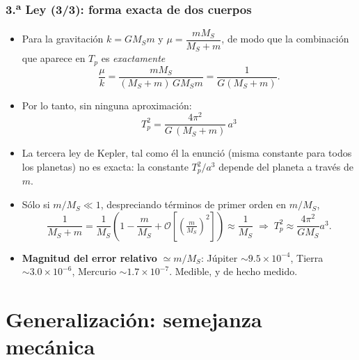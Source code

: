 \documentclass[10pt]{beamer}
\begin{document}
\begin{frame}
\frametitle{3.\textsuperscript{a} Ley (3/3): forma exacta de dos cuerpos}
\begin{itemize}
  \item<1-> Para la gravitación $k=GM_S m$ y $\mu=\dfrac{mM_S}{M_S+m}$, de modo
        que la combinación que aparece en $T_p$ es \emph{exactamente}
        \[ \frac{\mu}{k}=\frac{mM_S}{(M_S+m)\,G M_S m}=\frac{1}{G(M_S+m)} . \]
  \item<2-> Por lo tanto, sin ninguna aproximación:
        \[ \boxed{\;T_p^{2}=\frac{4\pi^{2}}{G\,(M_S+m)}\,a^{3}\;} \]
  \item<3-> \alert{La tercera ley de Kepler, tal como él la enunció}
        (misma constante para todos los planetas) \alert{no es exacta}: la
        constante $T_p^{2}/a^{3}$ depende del planeta a través de $m$.
  \item<4-> Sólo si $m/M_S\ll 1$, despreciando términos de \alert{primer} orden
        en $m/M_S$,
        \[ \frac{1}{M_S+m}=\frac{1}{M_S}\left(1-\frac{m}{M_S}+\mathcal{O}
           \!\left[\left(\tfrac{m}{M_S}\right)^{2}\right]\right)
           \approx\frac{1}{M_S}
           \;\Longrightarrow\; T_p^{2}\approx\frac{4\pi^{2}}{GM_S}a^{3}. \]
  \item<5-> \textbf{Magnitud del error relativo} $\simeq m/M_S$:
        Júpiter $\sim 9.5\times10^{-4}$, Tierra $\sim 3.0\times10^{-6}$,
        Mercurio $\sim 1.7\times10^{-7}$. Medible, y de hecho medido.
\end{itemize}
\end{frame}

\section{Generalización: semejanza mecánica}
\end{document}
